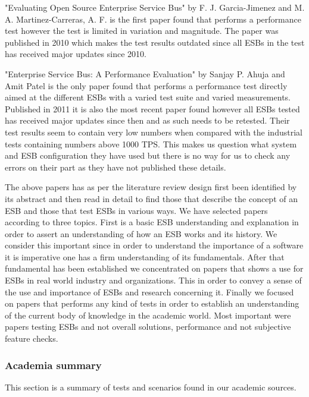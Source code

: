 "Evaluating Open Source Enterprise Service Bus" \cite{Garcia2010} by F. J. Garcia-Jimenez and M. A. Martinez-Carreras, A. F. is the first paper found that performs a performance test however the test is limited in variation and magnitude. The paper was published in 2010 which makes the test results outdated since all ESBs in the test has received major updates since 2010.


"Enterprise Service Bus: A Performance Evaluation" \cite{Sanjay2011} by Sanjay P. Ahuja and Amit Patel  is the only paper found that performs a performance test directly aimed at the different ESBs with a varied test suite and varied measurements. Published in 2011 it is also the most recent paper found however all ESBs tested has received major updates since then and as such needs to be retested. 
Their test results seem to contain very low numbers when compared with the industrial tests containing numbers above 1000 TPS. 
This makes us question what system and ESB configuration they have used but there is no way for us to check any errors on their part as they have not published these details.


The above papers has as per the literature review design first been identified by its abstract and then read in detail to find those that describe the concept of an ESB and those that test ESBs in various ways. We have selected papers according to three topics. First is a basic ESB understanding and explanation in order to assert an understanding of how an ESB works and its history. We consider this important since in order to understand the importance of a software it is imperative one has a firm understanding of its fundamentals. After that fundamental has been established we concentrated on papers that shows a use for ESBs in real world industry and organizations. This in order to convey a sense of the use and importance of ESBs and research concerning it.
Finally we focused on papers that performs any kind of tests in order to establish an understanding of the current body of knowledge in the academic world. Most important were papers testing ESBs and not overall solutions, performance and not subjective feature checks.


\subsubsection{Academia summary}
This section is a summary of tests and scenarios found in our academic sources.

